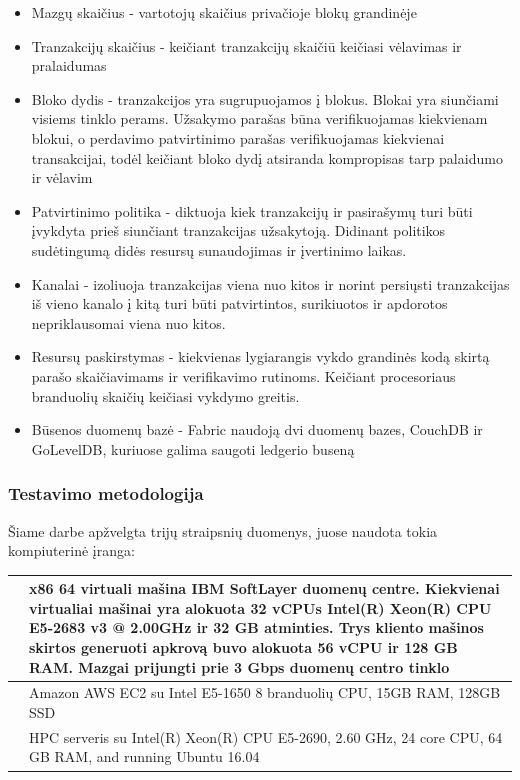 \documentclass{VUMIFPSkursinis}
\begin{document}
			\begin{itemize}
				\item{Mazgų skaičius - vartotojų skaičius privačioje blokų grandinėje}
				\item{Tranzakcijų skaičius - keičiant tranzakcijų skaičiū keičiasi vėlavimas ir pralaidumas}
				\item{Bloko dydis - tranzakcijos yra sugrupuojamos į blokus. Blokai yra siunčiami visiems tinklo perams. Užsakymo parašas 
būna verifikuojamas kiekvienam blokui, o perdavimo patvirtinimo parašas verifikuojamas kiekvienai transakcijai, todėl keičiant bloko dydį atsiranda kompropisas tarp palaidumo ir vėlavim}
				\item{Patvirtinimo politika - diktuoja kiek tranzakcijų ir pasirašymų turi būti įvykdyta prieš siunčiant tranzakcijas užsakytoją. Didinant politikos sudėtingumą didės resursų sunaudojimas ir įvertinimo laikas.}
				\item{Kanalai - izoliuoja tranzakcijas viena nuo kitos ir norint persiųsti tranzakcijas iš vieno kanalo į kitą turi būti patvirtintos, surikiuotos ir apdorotos nepriklausomai viena nuo kitos.}
				\item{Resursų paskirstymas - kiekvienas lygiarangis vykdo grandinės kodą skirtą parašo skaičiavimams ir verifikavimo rutinoms. Keičiant procesoriaus branduolių skaičių keičiasi vykdymo greitis.}
				\item{Būsenos duomenų bazė - Fabric naudoją dvi duomenų bazes, CouchDB ir GoLevelDB, kuriuose galima saugoti ledgerio buseną}
			\end{itemize}
		\subsubsection{Testavimo metodologija}
			Šiame darbe apžvelgta trijų straipsnių duomenys, juose naudota tokia kompiuterinė įranga:
			\begin{center}
				\begin{tabular}{ | m{5em} | m{10cm}| } 
					\hline
					\cite{IMBResearch}& x86 64 virtuali mašina IBM SoftLayer duomenų centre. 
					Kiekvienai virtualiai mašinai yra alokuota 32 vCPUs  Intel(R) Xeon(R)
					CPU E5-2683 v3 @ 2.00GHz ir 32 GB atminties. Trys kliento mašinos skirtos generuoti apkrovą buvo alokuota
					 56 vCPU ir 128 GB RAM. Mazgai prijungti prie 3 Gbps duomenų centro tinklo  \\ 
					\hline
					 \cite{ThailandPerf}& Amazon AWS EC2
					 su Intel E5-1650 8 branduolių CPU,
					15GB RAM, 128GB SSD  \\ 
					\hline
					 \cite{ShaFabPerf}& HPC serveris
					su Intel(R) Xeon(R) CPU E5-2690, 2.60 GHz, 24 core
					CPU, 64 GB RAM, and running Ubuntu 16.04  \\ 
					\hline
				\end{tabular}
			\end{center}
\end{document}
